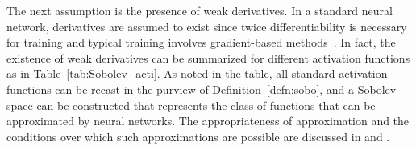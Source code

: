 The next assumption is the presence of weak derivatives. In a standard neural network, derivatives are assumed to exist since twice differentiability is necessary for training and typical training involves gradient-based methods~\cite{kingmaAdamMethodStochastic2017}. In fact, the existence of weak derivatives can be summarized for different activation functions as in Table~\ref{tab:Sobolev_acti}. As noted in the table, all standard activation functions can be recast in the purview of Definition~\ref{defn:sobo}, and a Sobolev space can be constructed that represents the class of functions that can be approximated by neural networks. The appropriateness of approximation and the conditions over which such approximations are possible are discussed in \cite{petersenTopologicalPropertiesSet2021a}  and \cite{adegokeHigherDerivativesInverse2016}.
\begin{table}[!tb]
\end{table}
